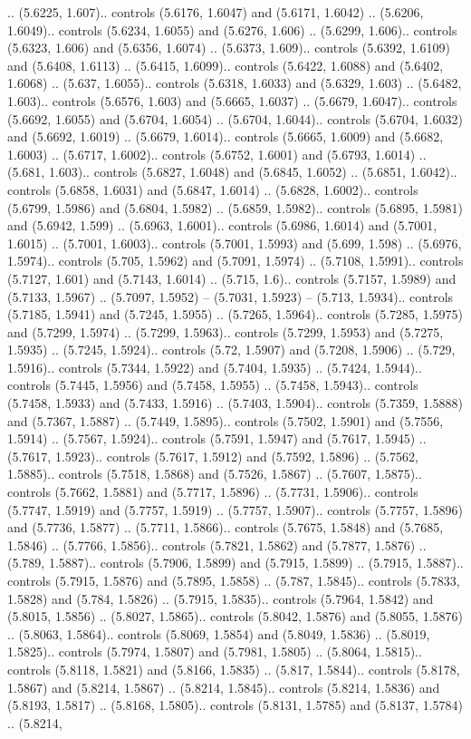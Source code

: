 .. (5.6225, 1.607).. controls (5.6176, 1.6047) and (5.6171, 1.6042) .. (5.6206, 1.6049).. controls (5.6234, 1.6055) and (5.6276, 1.606) .. (5.6299, 1.606).. controls (5.6323, 1.606) and (5.6356, 1.6074) .. (5.6373, 1.609).. controls (5.6392, 1.6109) and (5.6408, 1.6113) .. (5.6415, 1.6099).. controls (5.6422, 1.6088) and (5.6402, 1.6068) .. (5.637, 1.6055).. controls (5.6318, 1.6033) and (5.6329, 1.603) .. (5.6482, 1.603).. controls (5.6576, 1.603) and (5.6665, 1.6037) .. (5.6679, 1.6047).. controls (5.6692, 1.6055) and (5.6704, 1.6054) .. (5.6704, 1.6044).. controls (5.6704, 1.6032) and (5.6692, 1.6019) .. (5.6679, 1.6014).. controls (5.6665, 1.6009) and (5.6682, 1.6003) .. (5.6717, 1.6002).. controls (5.6752, 1.6001) and (5.6793, 1.6014) .. (5.681, 1.603).. controls (5.6827, 1.6048) and (5.6845, 1.6052) .. (5.6851, 1.6042).. controls (5.6858, 1.6031) and (5.6847, 1.6014) .. (5.6828, 1.6002).. controls (5.6799, 1.5986) and (5.6804, 1.5982) .. (5.6859, 1.5982).. controls (5.6895, 1.5981) and (5.6942, 1.599) .. (5.6963, 1.6001).. controls (5.6986, 1.6014) and (5.7001, 1.6015) .. (5.7001, 1.6003).. controls (5.7001, 1.5993) and (5.699, 1.598) .. (5.6976, 1.5974).. controls (5.705, 1.5962) and (5.7091, 1.5974) .. (5.7108, 1.5991).. controls (5.7127, 1.601) and (5.7143, 1.6014) .. (5.715, 1.6).. controls (5.7157, 1.5989) and (5.7133, 1.5967) .. (5.7097, 1.5952) -- (5.7031, 1.5923) -- (5.713, 1.5934).. controls (5.7185, 1.5941) and (5.7245, 1.5955) .. (5.7265, 1.5964).. controls (5.7285, 1.5975) and (5.7299, 1.5974) .. (5.7299, 1.5963).. controls (5.7299, 1.5953) and (5.7275, 1.5935) .. (5.7245, 1.5924).. controls (5.72, 1.5907) and (5.7208, 1.5906) .. (5.729, 1.5916).. controls (5.7344, 1.5922) and (5.7404, 1.5935) .. (5.7424, 1.5944).. controls (5.7445, 1.5956) and (5.7458, 1.5955) .. (5.7458, 1.5943).. controls (5.7458, 1.5933) and (5.7433, 1.5916) .. (5.7403, 1.5904).. controls (5.7359, 1.5888) and (5.7367, 1.5887) .. (5.7449, 1.5895).. controls (5.7502, 1.5901) and (5.7556, 1.5914) .. (5.7567, 1.5924).. controls (5.7591, 1.5947) and (5.7617, 1.5945) .. (5.7617, 1.5923).. controls (5.7617, 1.5912) and (5.7592, 1.5896) .. (5.7562, 1.5885).. controls (5.7518, 1.5868) and (5.7526, 1.5867) .. (5.7607, 1.5875).. controls (5.7662, 1.5881) and (5.7717, 1.5896) .. (5.7731, 1.5906).. controls (5.7747, 1.5919) and (5.7757, 1.5919) .. (5.7757, 1.5907).. controls (5.7757, 1.5896) and (5.7736, 1.5877) .. (5.7711, 1.5866).. controls (5.7675, 1.5848) and (5.7685, 1.5846) .. (5.7766, 1.5856).. controls (5.7821, 1.5862) and (5.7877, 1.5876) .. (5.789, 1.5887).. controls (5.7906, 1.5899) and (5.7915, 1.5899) .. (5.7915, 1.5887).. controls (5.7915, 1.5876) and (5.7895, 1.5858) .. (5.787, 1.5845).. controls (5.7833, 1.5828) and (5.784, 1.5826) .. (5.7915, 1.5835).. controls (5.7964, 1.5842) and (5.8015, 1.5856) .. (5.8027, 1.5865).. controls (5.8042, 1.5876) and (5.8055, 1.5876) .. (5.8063, 1.5864).. controls (5.8069, 1.5854) and (5.8049, 1.5836) .. (5.8019, 1.5825).. controls (5.7974, 1.5807) and (5.7981, 1.5805) .. (5.8064, 1.5815).. controls (5.8118, 1.5821) and (5.8166, 1.5835) .. (5.817, 1.5844).. controls (5.8178, 1.5867) and (5.8214, 1.5867) .. (5.8214, 1.5845).. controls (5.8214, 1.5836) and (5.8193, 1.5817) .. (5.8168, 1.5805).. controls (5.8131, 1.5785) and (5.8137, 1.5784) .. (5.8214, 